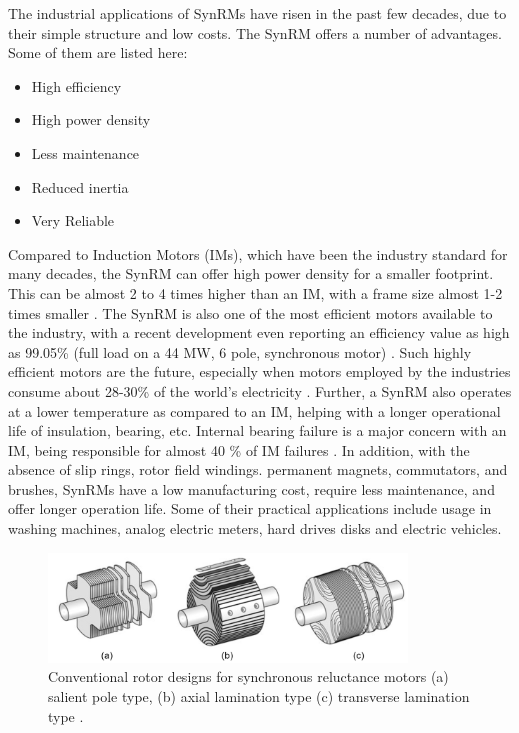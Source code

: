 The industrial applications of SynRMs have risen in the past few decades, due to their simple structure and low costs. The SynRM offers a number of advantages. Some of them are listed here:

\begin{itemize}
    \item High efficiency
    \item High power density
    \item Less maintenance
    \item Reduced inertia
    \item Very Reliable
\end{itemize}

Compared to Induction Motors (IMs), which have been the industry standard for many decades, the SynRM can offer high power density for a smaller footprint. 
This can be almost 2 to 4 times higher than an IM, with a frame size almost 1-2 times smaller \parencite{ABB_driving_force_REE}. The SynRM is also one of the most efficient motors available to the industry, with a recent development even reporting an efficiency value as high as 99.05\% (full load on a 44 MW, 6 pole, synchronous motor) \parencite{ABB_record_99}. Such highly efficient motors are the future, especially when motors employed by the industries consume about 28-30\% of the world's electricity \parencite{kober2020global, IEA_WEO_2019}. Further, a SynRM also operates at a lower temperature as compared to an IM, helping with a longer operational life of insulation, bearing, etc. Internal bearing failure is a major concern with an IM, being responsible for almost 40 \% of IM failures \parencite[IEEE Survey]{IEEE_IM_survey}. In addition, with the absence of slip rings, rotor field windings. permanent magnets, commutators, and brushes, SynRMs have a low manufacturing cost, require less maintenance, and offer longer operation life. Some of their practical applications include usage in washing machines, analog electric meters, hard drives disks and electric vehicles.

\begin{figure}[h!]
    \centering
    \includegraphics[width=0.85\textwidth]{Figures/Ch_MDP/reluctance_motor_rotor.png}
    \caption{Conventional rotor designs for synchronous reluctance motors (a) salient pole type, (b) axial lamination type (c) transverse lamination type \parencite{kolehmainen2010synchronous}.}
    \label{fig:MDP_SynRM_rotor_geo}
\end{figure}

